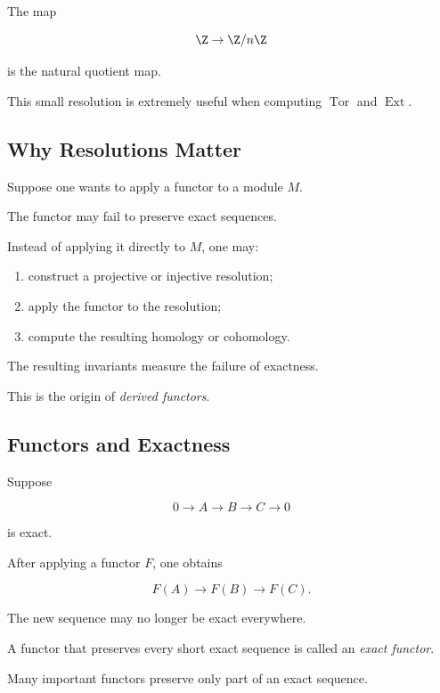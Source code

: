 The map

\[ \Z\to\Z/n\Z \]

is the natural quotient map.

This small resolution is extremely useful when computing \(\operatorname{Tor}\)
and \(\operatorname{Ext}\).

\subsection{Why Resolutions Matter}
\label{subsec:why-resolutions-matter}

Suppose one wants to apply a functor to a module \(M\).

The functor may fail to preserve exact sequences.

Instead of applying it directly to \(M\), one may:

\begin{enumerate}
    \item construct a projective or injective resolution;
    \item apply the functor to the resolution;
    \item compute the resulting homology or cohomology.
\end{enumerate}

The resulting invariants measure the failure of exactness.

This is the origin of \emph{derived functors}.

\subsection{Functors and Exactness}
\label{subsec:functors-exactness}

Suppose

\[ 0\to A\to B\to C\to0 \]

is exact.

After applying a functor \(F\), one obtains

\[ F(A)\to F(B)\to F(C). \]

The new sequence may no longer be exact everywhere.

A functor that preserves every short exact sequence is called an
\emph{exact functor}.

Many important functors preserve only part of an exact sequence.

